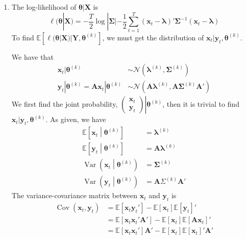 \documentclass[letterpaper,10pt]{amsart}
\newcommand{\E}[1]{\mathbb{E}\!\left[#1\right]}
\newcommand{\Var}{\operatorname{Var}}
\newcommand{\Cov}{\operatorname{Cov}}
\newcommand{\sN}{\mathcal{N}}
\begin{document}
\begin{enumerate}[{1}.1]
\item 
The log-likelihood of $\boldsymbol \theta | \boldsymbol X$ is
\[\ell(\boldsymbol \theta | \boldsymbol X) = -\frac{T}{2}\log | \boldsymbol \Sigma| - \frac{1}{2}\sum_{t=1}^T (\boldsymbol x_t - \boldsymbol \lambda)' \boldsymbol \Sigma^{-1} (\boldsymbol x_t - \boldsymbol \lambda) \]
To find $\E{\ell(\boldsymbol \theta | \boldsymbol X) | \boldsymbol Y, \boldsymbol \theta^{(k)}}$, we must get the distribution of $\boldsymbol x_t | \boldsymbol y_t, \boldsymbol \theta^{(k)}$.

We have that
\begin{align*}
\boldsymbol x_t | \boldsymbol \theta^{(k)} &\sim \sN(\boldsymbol \lambda^{(k)}, \boldsymbol \Sigma^{(k)})\\
\boldsymbol y_t | \boldsymbol \theta^{(k)} = \boldsymbol A \boldsymbol x_t | \boldsymbol \theta^{(k)} &\sim \sN(\boldsymbol A \boldsymbol \lambda^{(k)}, \boldsymbol A \boldsymbol \Sigma^{(k)} \boldsymbol A')
\end{align*}
We first find the joint probability, $\left.\begin{pmatrix}
\boldsymbol x_t \\ \boldsymbol y_t
\end{pmatrix} \right| \boldsymbol \theta^{(k)}$, then it is trivial to find $\boldsymbol x_t | \boldsymbol y_t, \boldsymbol \theta^{(k)}$.
As given, we have
\begin{align*}
\E{\boldsymbol x_t \middle| \boldsymbol \theta^{(k)}} &= \boldsymbol \lambda^{(k)}\\
\E{\boldsymbol y_t \middle| \boldsymbol \theta^{(k)}} &= \boldsymbol A\boldsymbol \lambda^{(k)}\\
\Var\left(\boldsymbol x_t \middle| \boldsymbol \theta^{(k)}\right) &=\boldsymbol \Sigma^{(k)}\\
\Var\left(\boldsymbol y_t \middle| \boldsymbol \theta^{(k)}\right) &= \boldsymbol A\Sigma^{(k)}\boldsymbol A'
\end{align*}
The variance-covariance matrix between $\boldsymbol x_t$ and $\boldsymbol y_t$ is
\begin{align*}
\Cov(\boldsymbol x_t, \boldsymbol y_t) &= \E{\boldsymbol x_t \boldsymbol y_t'} - \E{\boldsymbol x_t}\E{\boldsymbol y_t}'\\
&= \E{\boldsymbol x_t \boldsymbol x_t' \boldsymbol A'} - \E{\boldsymbol x_t}\E{\boldsymbol A \boldsymbol x_t}'\\
&= \E{\boldsymbol x_t \boldsymbol x_t'}\boldsymbol A' - \E{\boldsymbol x_t}\E{\boldsymbol x_t}' \boldsymbol A'\\

\end{align*}
\end{enumerate}
\end{document}
